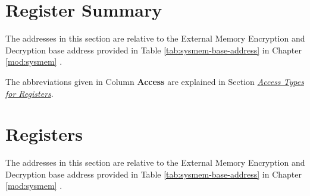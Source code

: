 \documentclass[main\_\_EN.tex]{subfiles}
\begin{document}

\newpage
\section{Register Summary}
\label{sec:extmemencr-reg-summ}
\hypertarget{extmemencr-reg-summ}{}

The addresses in this section are relative to the External Memory Encryption and Decryption base address provided in Table \ref{tab:sysmem-base-address} in Chapter \ref{mod:sysmem} \textit{}.

The abbreviations given in Column \textbf{Access} are explained in Section \hyperref[glossary-access-types]{\textit{Access Types for Registers}}.





\newpage
\section{Registers}

The addresses in this section are relative to the External Memory Encryption and Decryption base address provided in Table \ref{tab:sysmem-base-address} in Chapter \ref{mod:sysmem} \textit{}.


\end{document}

